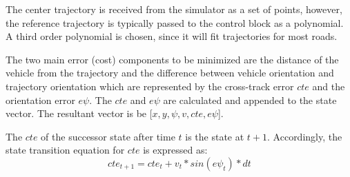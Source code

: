 The center trajectory is received from the simulator as a set of points, however, the reference trajectory is typically passed to the control block as a polynomial. A third order polynomial is chosen, since it will fit trajectories for most roads.

The two main error (cost) components to be minimized are the distance of the vehicle from the trajectory and the difference between vehicle orientation and trajectory orientation which are represented by the cross-track error \(cte\) and the orientation error \(e\psi\). The \(cte\) and \(e\psi\) are calculated and appended to the state vector. The resultant vector is be [\(x, y, \psi, v, cte, e\psi\)].

The \(cte\) of the successor state after time \(t\) is the state at \(t+1\). Accordingly, the state transition equation for \(cte\) is expressed as:
\begin{equation}
cte_{t+1} = cte_t + v_t* sin(e\psi_t) * dt
\label{st_cte_1}
\end{equation}


